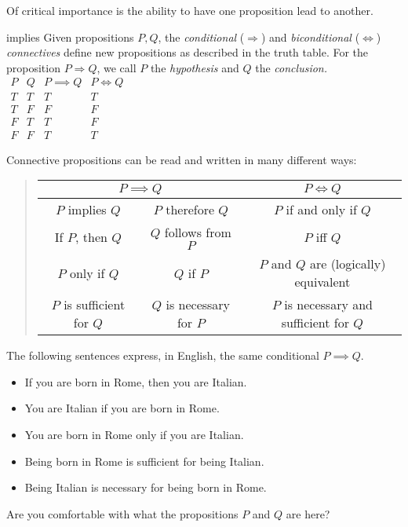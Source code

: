 Of critical importance is the ability to have one proposition lead to another.

\begin{defn}[lower separated=false, sidebyside, sidebyside align=top seam, sidebyside gap=0pt, righthand width=0.37\linewidth]{}{implies}
	Given propositions $P,Q$, the \emph{conditional} ($\Longrightarrow$) and \emph{biconditional} ($\Longleftrightarrow$) \emph{connectives} define new propositions as described in the truth table.\smallbreak
	For the proposition $P\Longrightarrow Q$, we call $P$ the \emph{hypothesis} and $Q$ the \emph{conclusion.}
	\tcblower
	\flushright$\begin{array}{cc||c|c}
	P & Q & P\implies Q & P\iff Q\\\hline
	T & T & T & T\\
	T & F & F & F\\
	F & T & T & F\\
	F & F & T & T
	\end{array}$
\end{defn}


Connective propositions can be read and written in many different ways:
\begin{quote}
	\def\arraystretch{1.05}
	\begin{tabular}{@{}cc|c}
		\multicolumn{2}{c|}{$P\implies Q$} & $P\iff Q$\\\hline
		$P$ implies $Q$ & $P$ therefore $Q$ & $P$ if and only if $Q$\\
		If $P$, then $Q$ & $Q$ follows from $P$ & $P$ iff $Q$\\
		$P$ only if $Q$ & $Q$ if $P$ & $P$ and $Q$ are (logically) equivalent\\
		$P$ is sufficient for $Q$ & $Q$ is necessary for $P$ & $P$ is necessary and sufficient for $Q$
	\end{tabular}
\end{quote}


\begin{example}{}{}
	The following sentences express, in English, the same conditional $P\implies Q$.\vspace{-1pt}
	\begin{itemize}\itemsep1pt
		\item If you are born in Rome, then you are Italian. 
		\item You are Italian if you are born in Rome. 
		\item You are born in Rome only if you are Italian. 
		\item Being born in Rome is sufficient for being Italian. 
		\item Being Italian is necessary for being born in Rome.\vspace{-1pt} 
	\end{itemize}
	Are you comfortable with what the propositions $P$ and $Q$ are here?
\end{example}

